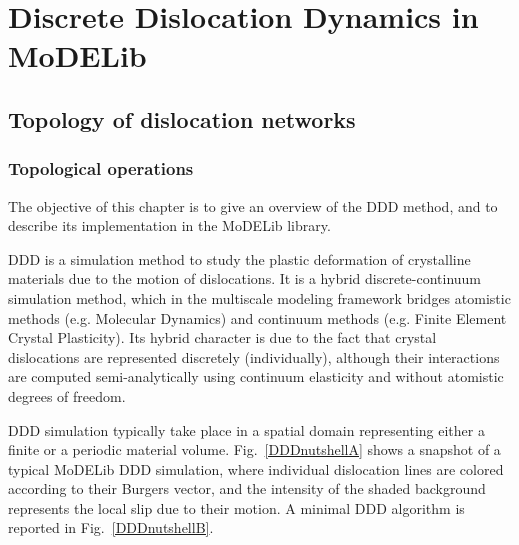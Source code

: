 \newpage
\chapter{Discrete Dislocation Dynamics  in MoDELib}



\section{Topology of dislocation networks}

\subsection{Topological operations}



The objective of this chapter is to give an overview of the DDD method, and to describe its implementation in the MoDELib library. 

DDD is a simulation method to study the plastic deformation of crystalline materials due to the motion of dislocations. 
It is a hybrid discrete-continuum simulation method, which  in the multiscale modeling framework bridges   atomistic  methods (e.g. Molecular Dynamics) and continuum methods (e.g. Finite Element Crystal Plasticity). 
Its hybrid character is due to the fact that crystal dislocations are represented discretely (individually), although their interactions are computed semi-analytically using continuum elasticity and without atomistic degrees of freedom.
 
DDD simulation typically take place in a spatial domain representing either a finite or a periodic material volume. Fig.~\ref{DDDnutshellA} shows a snapshot of a typical MoDELib DDD simulation, where individual dislocation lines are colored according to their Burgers vector, and the intensity of the shaded background represents the local slip due to their motion.  A minimal DDD algorithm is reported in Fig.~\ref{DDDnutshellB}. 




